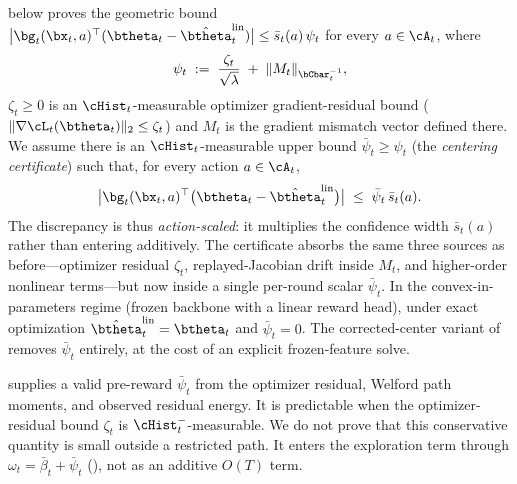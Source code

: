 \begin{assumption}\label{asm:optim}
 below proves the geometric bound
$\bigl|\bg_t(\bx_t,a)^\top(\btheta_t-\hat\btheta_t^{\mathrm{lin}})\bigr|
\le\bar s_t(a)\,\psi_t$ for every $a\in\cA_t$, where
\begin{equation}\label{eq:psi-def}
  \psi_t \;:=\; \frac{\zeta_t}{\sqrt{\lambda}}
  \;+\; \|M_t\|_{\bCbar_t^{-1}},
\end{equation}
$\zeta_t\ge0$ is an $\cHist_t$-measurable optimizer gradient-residual bound
($\|\nabla\cL_t(\btheta_t)\|_2\le\zeta_t$) and $M_t$ is the gradient
mismatch vector defined there.
We assume there is an $\cHist_t$-measurable upper bound
$\bar\psi_t\ge\psi_t$ (the \emph{centering certificate}) such that,
for every action $a\in\cA_t$,
\begin{equation}\label{eq:pred-stab}
  \bigl|\bg_t(\bx_t,a)^\top
    \bigl(\btheta_t - \hat\btheta_t^{\mathrm{lin}}\bigr)\bigr|
  \;\le\;
  \bar\psi_t\,\bar s_t(a).
\end{equation}
The discrepancy is thus \emph{action-scaled}: it multiplies the
confidence width $\bar s_t(a)$ rather than entering additively.  The
certificate absorbs the same three sources as before---optimizer residual
$\zeta_t$, replayed-Jacobian drift inside $M_t$, and higher-order nonlinear
terms---but now inside a single per-round scalar $\bar\psi_t$.
In the convex-in-parameters regime (frozen backbone with a linear reward
head), under exact optimization $\hat\btheta_t^{\mathrm{lin}}=\btheta_t$ and
$\bar\psi_t=0$.
The corrected-center variant of  removes
$\bar\psi_t$ entirely, at the cost of an explicit frozen-feature solve.
\end{assumption}

\begin{remark}
 supplies a valid pre-reward $\bar\psi_t$ from
the optimizer residual, Welford path moments, and observed residual energy.
It is predictable when the optimizer-residual bound $\zeta_t$ is
$\cHist_t^-$-measurable.
We do not prove that this conservative quantity is small outside a restricted
path.  It enters the exploration term
through $\omega_t=\bar\beta_t+\bar\psi_t$
(), not as an additive $O(T)$ term.
\end{remark}

